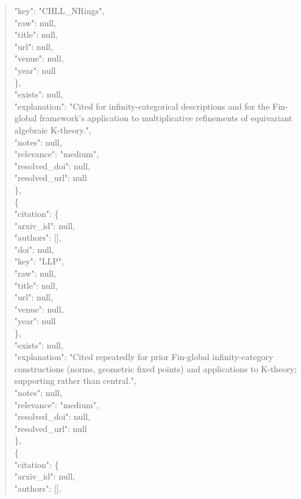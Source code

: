 \documentclass[11pt]{article}
\begin{document}
\begin{quote}
        "key": "CHLL\_NRings",\\
        "raw": null,\\
        "title": null,\\
        "url": null,\\
        "venue": null,\\
        "year": null\\
      \},\\
      "exists": null,\\
      "explanation": "Cited for infinity-categorical descriptions and for the Fin-global framework's application to multiplicative refinements of equivariant algebraic K-theory.",\\
      "notes": null,\\
      "relevance": "medium",\\
      "resolved\_doi": null,\\
      "resolved\_url": null\\
    \},\\
    \{\\
      "citation": \{\\
        "arxiv\_id": null,\\
        "authors": [],\\
        "doi": null,\\
        "key": "LLP",\\
        "raw": null,\\
        "title": null,\\
        "url": null,\\
        "venue": null,\\
        "year": null\\
      \},\\
      "exists": null,\\
      "explanation": "Cited repeatedly for prior Fin-global infinity-category constructions (norms, geometric fixed points) and applications to K-theory; supporting rather than central.",\\
      "notes": null,\\
      "relevance": "medium",\\
      "resolved\_doi": null,\\
      "resolved\_url": null\\
    \},\\
    \{\\
      "citation": \{\\
        "arxiv\_id": null,\\
        "authors": [],\\

\end{quote}
\end{document}
